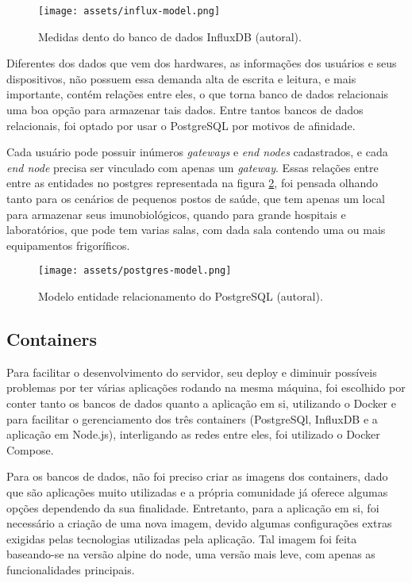 \begin{figure}[H]
  \centering
  \texttt{[image: assets/influx-model.png]} 
  \caption{Medidas dento do banco de dados InfluxDB (autoral).}
  \label{fig:influxdb-model} 
\end{figure}

Diferentes dos dados que vem dos hardwares, as informações dos usuários e seus dispositivos, não possuem essa demanda alta de escrita e leitura, e mais importante, contém relações entre eles, o que torna banco de dados relacionais uma boa opção para armazenar tais dados. Entre tantos bancos de dados relacionais, foi optado por usar o PostgreSQL por motivos de afinidade.

Cada usuário pode possuir inúmeros \textit{gateways} e \textit{end nodes} cadastrados, e cada \textit{end node} precisa ser vinculado com apenas um \textit{gateway}. Essas relações entre entre as entidades no postgres representada na figura \ref{fig:postgres-model}, foi pensada olhando tanto para os cenários de pequenos postos de saúde, que tem apenas um local para armazenar seus imunobiológicos, quando para grande hospitais e laboratórios, que pode tem varias salas, com dada sala contendo uma ou mais equipamentos frigoríficos.

\begin{figure}[H]
  \centering
  \texttt{[image: assets/postgres-model.png]} 
  \caption{Modelo entidade relacionamento do PostgreSQL (autoral).}
  \label{fig:postgres-model} 
\end{figure}

\subsection{Containers}
\label{metod:servidor:containers}
Para facilitar o desenvolvimento do servidor, seu deploy e diminuir possíveis problemas por ter várias aplicações rodando na mesma máquina, foi escolhido por conter tanto os bancos de dados quanto a aplicação em si, utilizando o Docker e para facilitar o gerenciamento dos três containers (PostgreSQl, InfluxDB e a aplicação em Node.js), interligando as redes entre eles, foi utilizado o Docker Compose.

Para os bancos de dados, não foi preciso criar as imagens dos containers, dado que são aplicações muito utilizadas e a própria comunidade já oferece algumas opções dependendo da sua finalidade. Entretanto, para a aplicação em si, foi necessário a criação de uma nova imagem, devido algumas configurações extras exigidas pelas tecnologias utilizadas pela aplicação. Tal imagem foi feita baseando-se na versão alpine do node, uma versão mais leve, com apenas as funcionalidades principais.

